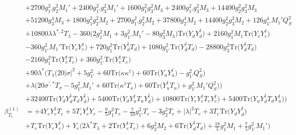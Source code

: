 {\begin{align}
 &+2700 g_{1'}^{2} g_{2}^{2} M_1' +2400 g_{1'}^{2} g_{3}^{2} M_1' +1600 g_{1}^{2} g_{3}^{2} M_3 +2400 g_{1'}^{2} g_{3}^{2} M_3 +14400 g_{2}^{2} g_{3}^{2} M_3 \nonumber \\ 
 &+51200 g_{3}^{4} M_3 +1800 g_{1}^{2} g_{2}^{2} M_2 +2700 g_{1'}^{2} g_{2}^{2} M_2 +37800 g_{2}^{4} M_2 +14400 g_{2}^{2} g_{3}^{2} M_2 +126 g_{1'}^{4} M_1' Q_{S}^{2} \nonumber \\ 
 &+10800 \lambda \lambda^{*,2} T_{\lambda} -360 \Big(2 g_{1}^{2} M_1  + 3 g_{1'}^{2} M_1'  -80 g_{3}^{2} M_3 \Big)\mbox{Tr}\Big({Y_d  Y_{d}^{\dagger}}\Big) +2160 g_{1}^{2} M_1 \mbox{Tr}\Big({Y_e  Y_{e}^{\dagger}}\Big) \nonumber \\ 
 &-360 g_{1'}^{2} M_1' \mbox{Tr}\Big({Y_e  Y_{e}^{\dagger}}\Big) +720 g_{1}^{2} \mbox{Tr}\Big({Y_{d}^{\dagger}  T_d}\Big) +1080 g_{1'}^{2} \mbox{Tr}\Big({Y_{d}^{\dagger}  T_d}\Big) -28800 g_{3}^{2} \mbox{Tr}\Big({Y_{d}^{\dagger}  T_d}\Big) \nonumber \\ 
 &-2160 g_{1}^{2} \mbox{Tr}\Big({Y_{e}^{\dagger}  T_e}\Big) +360 g_{1'}^{2} \mbox{Tr}\Big({Y_{e}^{\dagger}  T_e}\Big) \nonumber \\ 
 &+90 \lambda^* \Big(T_{\lambda} \Big(20 |\sigma|^2  + 5 g_{1'}^{2}  + 60 \mbox{Tr}\Big({\kappa  \kappa^{\dagger}}\Big)  + 60 \mbox{Tr}\Big({Y_u  Y_{u}^{\dagger}}\Big)  - g_{1'}^{2} Q_{S}^{2} \Big)\nonumber \\ 
 &+\lambda \Big(20 \sigma^{\prime,*} T_{\sigma}  -5 g_{1'}^{2} M_1'  + 60 \mbox{Tr}\Big({\kappa^{\dagger}  T_{\kappa}}\Big)  + 60 \mbox{Tr}\Big({Y_{u}^{\dagger}  T_u}\Big)  + g_{1'}^{2} M_1' Q_{S}^{2} \Big)\Big)\nonumber \\ 
 &+32400 \mbox{Tr}\Big({Y_d  Y_{d}^{\dagger}  T_d  Y_{d}^{\dagger}}\Big) +5400 \mbox{Tr}\Big({Y_d  Y_{u}^{\dagger}  T_u  Y_{d}^{\dagger}}\Big) +10800 \mbox{Tr}\Big({Y_e  Y_{e}^{\dagger}  T_e  Y_{e}^{\dagger}}\Big) +5400 \mbox{Tr}\Big({Y_u  Y_{d}^{\dagger}  T_d  Y_{u}^{\dagger}}\Big) \Big)\\ 
\beta_{T_e}^{(1)} & =  
+4 {Y_e  Y_{e}^{\dagger}  T_e} +5 {T_e  Y_{e}^{\dagger}  Y_e} -\frac{9}{5} g_{1}^{2} T_e -\frac{7}{10} g_{1'}^{2} T_e -3 g_{2}^{2} T_e +|\lambda|^2 T_e +3 T_e \mbox{Tr}\Big({Y_d  Y_{d}^{\dagger}}\Big) \nonumber \\ 
 &+T_e \mbox{Tr}\Big({Y_e  Y_{e}^{\dagger}}\Big) +Y_e \Big(2 \lambda^* T_{\lambda}  + 2 \mbox{Tr}\Big({Y_{e}^{\dagger}  T_e}\Big)  + 6 g_{2}^{2} M_2  + 6 \mbox{Tr}\Big({Y_{d}^{\dagger}  T_d}\Big)  + \frac{18}{5} g_{1}^{2} M_1  + \frac{7}{5} g_{1'}^{2} M_1' \Big)\\ 

\end{align}}

